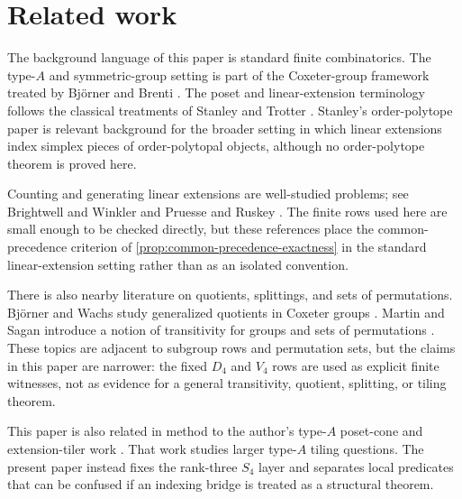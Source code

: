 \section{Related work}\label{sec:related-work}

The background language of this paper is standard finite combinatorics. The type-\(A\) and symmetric-group setting is part of the Coxeter-group framework treated by Bj{\"o}rner and Brenti \cite{BjornerBrenti2005}. The poset and linear-extension terminology follows the classical treatments of Stanley and Trotter \cite{Stanley2012EC1,Trotter1992}. Stanley's order-polytope paper \cite{Stanley1986} is relevant background for the broader setting in which linear extensions index simplex pieces of order-polytopal objects, although no order-polytope theorem is proved here.

Counting and generating linear extensions are well-studied problems; see Brightwell and Winkler \cite{BrightwellWinkler1991} and Pruesse and Ruskey \cite{PruesseRuskey1994}. The finite rows used here are small enough to be checked directly, but these references place the common-precedence criterion of \cref{prop:common-precedence-exactness} in the standard linear-extension setting rather than as an isolated convention.

There is also nearby literature on quotients, splittings, and sets of permutations. Bj{\"o}rner and Wachs study generalized quotients in Coxeter groups \cite{BjornerWachs1988}. Martin and Sagan introduce a notion of transitivity for groups and sets of permutations \cite{MartinSagan2006}. These topics are adjacent to subgroup rows and permutation sets, but the claims in this paper are narrower: the fixed \(D_4\) and \(V_4\) rows are used as explicit finite witnesses, not as evidence for a general transitivity, quotient, splitting, or tiling theorem.

This paper is also related in method to the author's type-\(A\) poset-cone and extension-tiler work \cite{BabanskyyTypeAPoset2026}. That work studies larger type-\(A\) tiling questions. The present paper instead fixes the rank-three \(S_4\) layer and separates local predicates that can be confused if an indexing bridge is treated as a structural theorem.